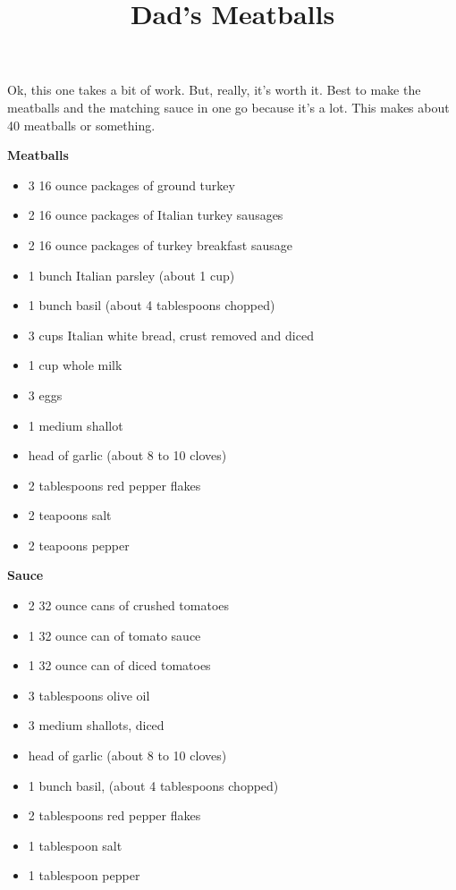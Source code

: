 \documentclass{article}
\title{Dad's Meatballs}
\begin{document}
Ok, this one takes a bit of work. But, really, it's worth it. Best to make the meatballs and the matching sauce in one
go because it's a lot. This makes about 40 meatballs or something.

\begin{multicols}{2}

      \textbf{Meatballs}
      \begin{itemize}
            \item 3 16 ounce packages of ground turkey
            \item 2 16 ounce packages of Italian turkey sausages
            \item 2 16 ounce packages of turkey breakfast sausage
            \item 1 bunch Italian parsley (about 1 cup)
            \item 1 bunch basil (about 4 tablespoons chopped)
            \item 3 cups Italian white bread, crust removed and diced
            \item 1 cup whole milk
            \item 3 eggs
            \item 1 medium shallot
            \item {} head of garlic (about 8 to 10 cloves)
            \item 2 tablespoons red pepper flakes
            \item 2 teapoons salt
            \item 2 teapoons pepper
      \end{itemize}

      \columnbreak

      \textbf{Sauce}
      \begin{itemize}
            \item 2 32 ounce cans of crushed tomatoes
            \item 1 32 ounce can of tomato sauce
            \item 1 32 ounce can of diced tomatoes
            \item 3 tablespoons olive oil
            \item 3 medium shallots, diced
            \item {} head of garlic (about 8 to 10 cloves)
            \item 1 bunch basil, (about 4 tablespoons chopped)
            \item 2 tablespoons red pepper flakes
            \item 1 tablespoon salt
            \item 1 tablespoon pepper
      \end{itemize}

\end{multicols}
\end{document}
